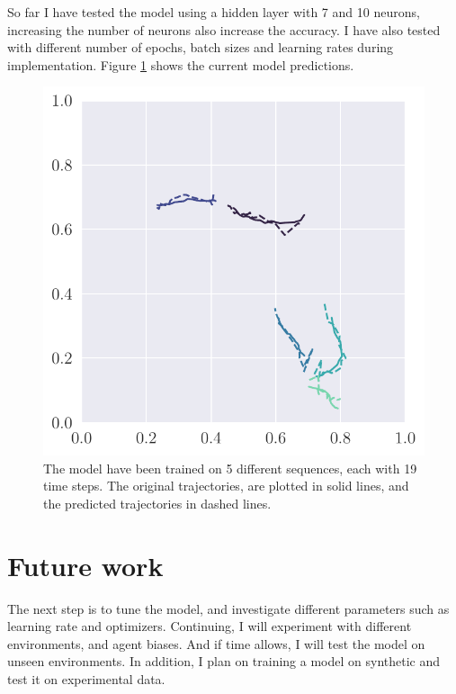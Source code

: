 So far I have tested the model using a hidden layer with 7 and 10 neurons, increasing the number of neurons also increase the accuracy. I have also tested with different number of epochs, batch sizes and learning rates during implementation. Figure \ref{fig:test_model} shows the current model predictions.
\begin{figure}[H]
    \centering
    \includegraphics[width=\linewidth]{project/latex/figures/test_model.pdf}
    \caption{The model have been trained on 5 different sequences, each with 19 time steps. The original trajectories, are plotted in solid lines, and the predicted trajectories in dashed lines. }
    \label{fig:test_model}
\end{figure}


\section{Future work}\label{sec:future_work}
The next step is to tune the model, and investigate different parameters such as learning rate and optimizers. Continuing, I will experiment with different environments, and agent biases. And if time allows, I will test the model on unseen environments. In addition, I plan on training a model on synthetic and test it on experimental data. 
